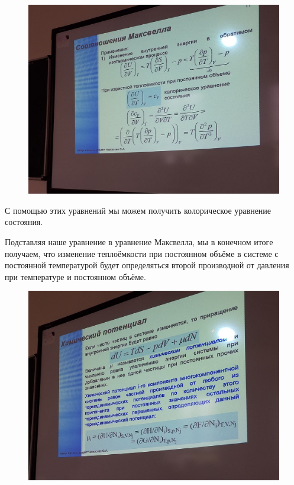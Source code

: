 \documentclass{article}
\begin{document}
\begin{figure}[H]
    \includegraphics[width=\textwidth]{10.jpg}
\end{figure}
С помощью этих уравнений мы можем получить колорическое уравнение состояния.

Подставляя наше уравнение в уравнение Максвелла, мы в конечном итоге получаем, что изменение теплоёмкости при постоянном объёме в системе с постоянной температурой будет определяться второй производной от давления при температуре и постоянном объёме.
\begin{figure}[H]
    \includegraphics[width=\textwidth]{12.jpg}
\end{figure}
\end{document}

